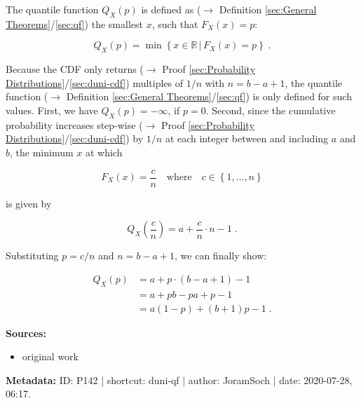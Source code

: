\documentclass[a4paper,12pt,twoside]{book}
\begin{document}
The quantile function $Q_X(p)$ is defined as ($\rightarrow$ Definition \ref{sec:General Theorems}/\ref{sec:qf}) the smallest $x$, such that $F_X(x) = p$:

\begin{equation} \label{eq:duni-qf-qf}
Q_X(p) = \min \left\lbrace x \in \mathbb{R} \, \vert \, F_X(x) = p \right\rbrace \; .
\end{equation}

Because the CDF only returns ($\rightarrow$ Proof \ref{sec:Probability Distributions}/\ref{sec:duni-cdf}) multiples of $1/n$ with $n = b - a + 1$, the quantile function ($\rightarrow$ Definition \ref{sec:General Theorems}/\ref{sec:qf}) is only defined for such values. First, we have $Q_X(p) = -\infty$, if $p = 0$. Second, since the cumulative probability increases step-wise ($\rightarrow$ Proof \ref{sec:Probability Distributions}/\ref{sec:duni-cdf}) by $1/n$ at each integer between and including $a$ and $b$, the minimum $x$ at which

\begin{equation} \label{eq:duni-qf-duni-cdf-p}
F_X(x) = \frac{c}{n} \quad \text{where} \quad c \in \left\lbrace 1, \ldots, n \right\rbrace
\end{equation}

is given by

\begin{equation} \label{eq:duni-qf-duni-qf-p}
Q_X\left( \frac{c}{n} \right) = a + \frac{c}{n} \cdot n - 1 \; .
\end{equation}

Substituting $p = c/n$ and $n = b - a + 1$, we can finally show:

\begin{equation} \label{eq:duni-qf-duni-qf-qed}
\begin{split}
Q_X(p) &= a + p \cdot (b-a+1) - 1 \\
&= a + pb - pa + p - 1 \\
&= a (1-p) + (b+1) p - 1 \; .
\end{split}
\end{equation}


\vspace{1em}
\textbf{Sources:}
\begin{itemize}
\item original work\end{itemize}


\vspace{1em}
\textbf{Metadata:} ID: P142 | shortcut: duni-qf | author: JoramSoch | date: 2020-07-28, 06:17.
\vspace{1em}
\end{document}

